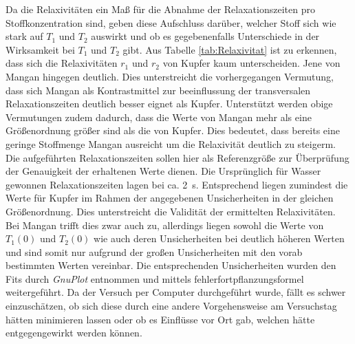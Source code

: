 Da die Relaxivitäten ein Maß für die Abnahme der Relaxationszeiten pro Stoffkonzentration sind, geben diese Aufschluss darüber, welcher Stoff sich wie stark auf $T_1$ und $T_2$ auswirkt und ob es gegebenenfalls Unterschiede in der Wirksamkeit bei $T_1$ und $T_2$ gibt.
Aus Tabelle \ref{tab:Relaxivitat} ist zu erkennen, dass sich die Relaxivitäten $r_1$ und $r_2$ von Kupfer kaum unterscheiden.
Jene von Mangan hingegen deutlich.
Dies unterstreicht die vorhergegangen Vermutung, dass sich Mangan als Kontrastmittel zur beeinflussung der transversalen Relaxationszeiten deutlich besser eignet als Kupfer.
Unterstützt werden obige Vermutungen zudem dadurch, dass die Werte von Mangan mehr als eine Größenordnung größer sind als die von Kupfer.
Dies bedeutet, dass bereits eine geringe Stoffmenge Mangan ausreicht um die Relaxivität deutlich zu steigerm.
Die aufgeführten Relaxationszeiten sollen hier als Referenzgröße zur Überprüfung der Genauigkeit der erhaltenen Werte dienen.
Die Ursprünglich für Wasser gewonnen Relaxationszeiten lagen bei ca. \SI{2}{\second}.
Entsprechend liegen zumindest die Werte für Kupfer im Rahmen der angegebenen Unsicherheiten in der gleichen Größenordnung.
Dies unterstreicht die Validität der ermittelten Relaxivitäten.
Bei Mangan trifft dies zwar auch zu, allerdings liegen sowohl die Werte von $T_1(0)$ und $T_2(0)$ wie auch deren Unsicherheiten bei deutlich höheren Werten und sind somit nur aufgrund der großen Unsicherheiten mit den vorab bestimmten Werten vereinbar.
Die entsprechenden Unsicherheiten wurden den Fits durch \textit{GnuPlot} entnommen und mittels fehlerfortpflanzungsformel weitergeführt.
Da der Versuch per Computer durchgeführt wurde, fällt es schwer einzuschätzen, ob sich diese durch eine andere Vorgehensweise am Versuchstag hätten minimieren lassen oder ob es Einflüsse vor Ort gab, welchen hätte entgegengewirkt werden können.
    

%     
